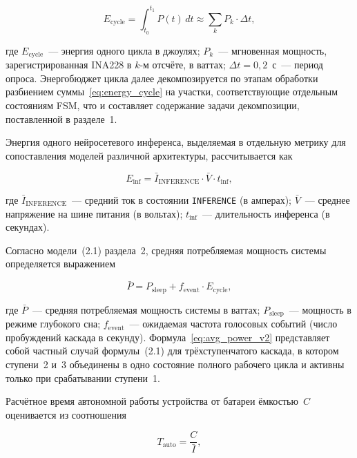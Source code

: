 \begin{equation}
	E_{\mathrm{cycle}} =
	\int_{t_0}^{t_1} P(t)\, dt \approx
	\sum_{k} P_k \cdot \Delta t,
	\label{eq:energy_cycle}
\end{equation}

где $E_{\mathrm{cycle}}$~--- энергия одного цикла в джоулях;
$P_k$~--- мгновенная мощность, зарегистрированная INA228 в
$k$-м отсчёте, в ваттах; $\Delta t = 0{,}2$~с~--- период
опроса. Энергобюджет цикла далее декомпозируется по этапам
обработки разбиением суммы~\eqref{eq:energy_cycle} на участки,
соответствующие отдельным состояниям FSM, что и составляет
содержание задачи декомпозиции, поставленной в разделе~1.

Энергия одного нейросетевого инференса, выделяемая в отдельную
метрику для сопоставления моделей различной архитектуры,
рассчитывается как

\begin{equation}
	E_{\mathrm{inf}} = \bar{I}_{\mathrm{INFERENCE}} \cdot
	\bar{V} \cdot t_{\mathrm{inf}},
	\label{eq:energy_inf}
\end{equation}

где $\bar{I}_{\mathrm{INFERENCE}}$~--- средний ток в состоянии
\texttt{INFERENCE} (в амперах); $\bar{V}$~--- среднее напряжение
на шине питания (в вольтах); $t_{\mathrm{inf}}$~--- длительность
инференса (в секундах).

Согласно модели~(2.1) раздела~2, средняя потребляемая мощность
системы определяется выражением

\begin{equation}
	\bar{P} = P_{\mathrm{sleep}} + f_{\mathrm{event}} \cdot E_{\mathrm{cycle}},
	\label{eq:avg_power_v2}
\end{equation}

где $\bar{P}$~--- средняя потребляемая мощность системы в
ваттах; $P_{\mathrm{sleep}}$~--- мощность в режиме глубокого
сна; $f_{\mathrm{event}}$~--- ожидаемая частота голосовых
событий (число пробуждений каскада в секунду).
Формула~\eqref{eq:avg_power_v2} представляет собой частный
случай формулы~(2.1) для трёхступенчатого каскада, в котором
ступени~2 и~3 объединены в одно состояние полного рабочего
цикла и активны только при срабатывании ступени~1.

Расчётное время автономной работы устройства от батареи
ёмкостью~$C$ оценивается из соотношения

\begin{equation}
	T_{\mathrm{auto}} = \frac{C}{\bar{I}},
	\label{eq:auto_time}
\end{equation}


